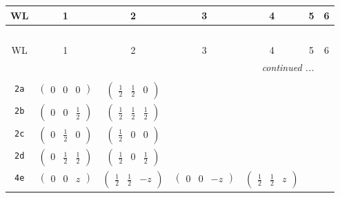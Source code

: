 \documentclass[fleqn,9pt,landscape]{jsarticle}
\begin{document}
\begin{center}
\renewcommand{\arraystretch}{1.2}
\begin{longtable}{ccccccc}
 \hline \hline
WL & 1 & 2 & 3 & 4 & 5 & 6 \\ \hline \endfirsthead

\multicolumn{6}{l}{\tablename\ \thetable{}} \\
 \hline \hline
WL & 1 & 2 & 3 & 4 & 5 & 6 \\ \hline \endhead

 \hline \hline
\multicolumn{6}{r}{\footnotesize\it continued ...} \\ \endfoot

 \hline \hline
\multicolumn{6}{r}{} \\ \endlastfoot

{\tt 2a} & $ \begin{pmatrix} 0 & 0 & 0 \end{pmatrix} $ & $ \begin{pmatrix} \frac{1}{2} & \frac{1}{2} & 0 \end{pmatrix} $ & $  $ & $  $ & $  $ & $  $ \\ \hline
{\tt 2b} & $ \begin{pmatrix} 0 & 0 & \frac{1}{2} \end{pmatrix} $ & $ \begin{pmatrix} \frac{1}{2} & \frac{1}{2} & \frac{1}{2} \end{pmatrix} $ & $  $ & $  $ & $  $ & $  $ \\ \hline
{\tt 2c} & $ \begin{pmatrix} 0 & \frac{1}{2} & 0 \end{pmatrix} $ & $ \begin{pmatrix} \frac{1}{2} & 0 & 0 \end{pmatrix} $ & $  $ & $  $ & $  $ & $  $ \\ \hline
{\tt 2d} & $ \begin{pmatrix} 0 & \frac{1}{2} & \frac{1}{2} \end{pmatrix} $ & $ \begin{pmatrix} \frac{1}{2} & 0 & \frac{1}{2} \end{pmatrix} $ & $  $ & $  $ & $  $ & $  $ \\ \hline
{\tt 4e} & $ \begin{pmatrix} 0 & 0 & z \end{pmatrix} $ & $ \begin{pmatrix} \frac{1}{2} & \frac{1}{2} & - z \end{pmatrix} $ & $ \begin{pmatrix} 0 & 0 & - z \end{pmatrix} $ & $ \begin{pmatrix} \frac{1}{2} & \frac{1}{2} & z \end{pmatrix} $ & $  $ & $  $ \\ \hline

\end{longtable}
\end{center}
\end{document}
